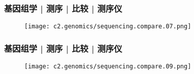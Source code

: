 \begin{frame}
  \frametitle{基因组学 | 测序 | 比较 | 测序仪}
  \begin{figure}
    \centering
    \texttt{[image: c2.genomics/sequencing.compare.07.png]}
  \end{figure}
\end{frame}


\begin{frame}
  \frametitle{基因组学 | 测序 | 比较 | 测序仪}
  \begin{figure}
    \centering
    \texttt{[image: c2.genomics/sequencing.compare.09.png]}
  \end{figure}
\end{frame}

